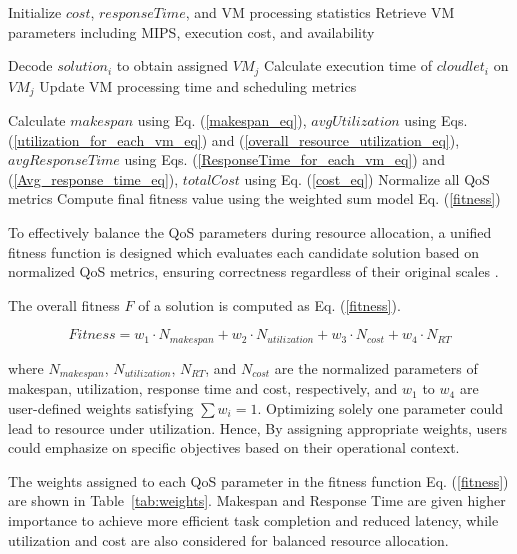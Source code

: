 \documentclass[pdflatex,sn-mathphys-num]{sn-jnl}%
\begin{document}
\begin{algorithm}
\small
\caption{Fitness Function}\label{alg:fitness_function}
\begin{algorithmic}[1]
    \State Initialize $cost$, $responseTime$, and VM processing statistics
    \State Retrieve VM parameters including MIPS, execution cost, and availability
    
        \State Decode $solution_i$ to obtain assigned $VM_j$
        \State Calculate execution time of $cloudlet_i$ on $VM_j$
        \State Update VM processing time and scheduling metrics
    \EndFor
    
    \State Calculate $makespan$ using Eq. (\ref{makespan_eq}), $avgUtilization$ using Eqs. (\ref{utilization_for_each_vm_eq}) and (\ref{overall_resource_utilization_eq}), $avgResponseTime$ using Eqs. (\ref{ResponseTime_for_each_vm_eq}) and (\ref{Avg_response_time_eq}), $totalCost$ using Eq. (\ref{cost_eq})
    \State Normalize all QoS metrics
    \State Compute final fitness value using the weighted sum model Eq. (\ref{fitness})
\EndProcedure
\end{algorithmic}
\end{algorithm}

To effectively balance the QoS parameters during resource allocation, a unified fitness function is designed which evaluates each candidate solution based on normalized QoS metrics, ensuring correctness regardless of their original scales \cite{GWO}. 

\singlespacing \noindent The overall fitness \( F \) of a solution is computed as Eq. (\ref{fitness}).

\begin{equation} \label{fitness}
Fitness = w_1 \cdot N_{makespan} + w_2 \cdot N_{utilization} + w_3 \cdot N_{cost} + w_4 \cdot N_{RT}
\end{equation}

where $N_{makespan}$, $N_{utilization}$, $N_{RT}$, and $N_{cost}$ are the normalized parameters of makespan, utilization, response time and cost, respectively, and $w_1$ to $w_4$ are user-defined weights satisfying $\sum w_i = 1$. Optimizing solely one parameter could lead to resource under utilization. Hence, By assigning appropriate weights, users could emphasize on specific objectives based on their operational context.

The weights assigned to each QoS parameter in the fitness function Eq. (\ref{fitness}) are shown in Table~\ref{tab:weights}. Makespan and Response Time are given higher importance to achieve more efficient task completion and reduced latency, while utilization and cost are also considered for balanced resource allocation.
\end{document}
